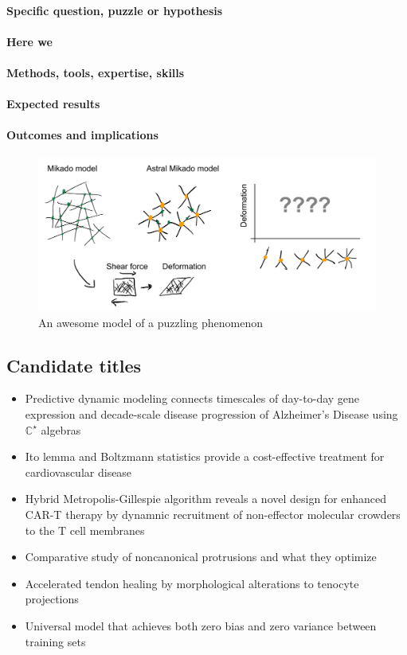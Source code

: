 \documentclass[onecolumn,11pt]{article}
\begin{document}
\paragraph{Specific question, puzzle or hypothesis}\lipsum[2]
\paragraph{Here we}\lipsum[2]
\paragraph{Methods, tools, expertise, skills}\lipsum[2]
\paragraph{Expected results}\lipsum[2]
\paragraph{Outcomes and implications}\lipsum[2]


\begin{figure}[h!]
\centering
\includegraphics[width=4.5in]{figures/figJeanJacket.pdf}
\caption{\label{fig:JeanJacketSchematic}An awesome model of a puzzling phenomenon}
\end{figure}

\subsection{Candidate titles}
 
\begin{itemize}
\item Predictive dynamic modeling connects timescales of day-to-day gene expression and decade-scale disease progression of Alzheimer's Disease using $\mathbb{C}^\star$ algebras
\item Ito lemma and Boltzmann statistics provide a cost-effective treatment for cardiovascular disease
\item Hybrid Metropolis-Gillespie algorithm reveals a novel design for enhanced CAR-T therapy by dynamnic recruitment of non-effector molecular crowders to the T cell membranes
\item Comparative study of noncanonical protrusions and what they optimize
\item Accelerated tendon healing by morphological alterations to tenocyte projections
\item Universal model that achieves both zero bias and zero variance between training sets
\end{itemize}
\end{document}
